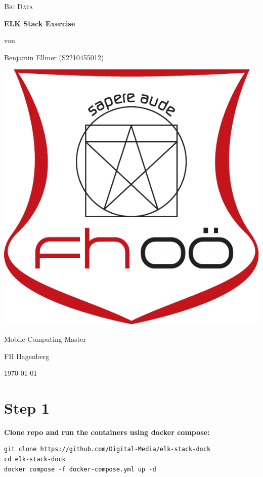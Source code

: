 \documentclass[14pt,a4paper]{extarticle}
\begin{document}
	\begin{titlepage}
		\centering
		{\scshape\LARGE Big Data \par}
		\vspace{2.5cm}
		{\huge\bfseries ELK Stack Exercise}
		\vfill
		{\normalsize von\par}
		{\normalsize Benjamin Ellmer (\textsc{S2210455012}) \par}
		\vspace{1cm}
		\includegraphics[width=0.3\textheight]{images/logo.pdf} \par
		\vspace{1cm}
		{\large Mobile Computing Master \par}
		{\large FH Hagenberg \par}
		\vfill
		{\large \today\par}
	\end{titlepage}

	\section*{Step 1}
	\noindent \textbf{Clone repo and run the containers using docker compose:}
	\begin{lstlisting}[style=fish]
git clone https://github.com/Digital-Media/elk-stack-dock
cd elk-stack-dock
docker compose -f docker-compose.yml up -d
	\end{lstlisting}
\end{document}
